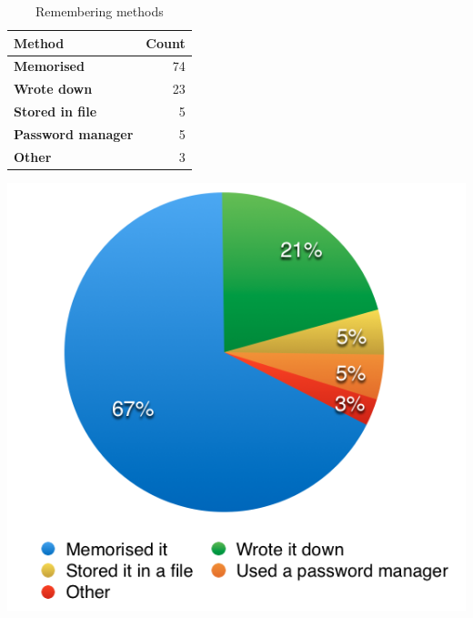     \begin{table}[htpb]
      \begin{minipage}[b]{0.42\linewidth}
        \centering
        \small
        \begin{tabular}{l r}
          \toprule
          \textbf{Method} & \textbf{Count} \\ \midrule
          \textbf{Memorised} & 74 \\
          \textbf{Wrote down} & 23 \\
          \textbf{Stored in file} & 5 \\
          \textbf{Password manager} & 5 \\
          \textbf{Other} & 3 \\ \bottomrule
        \end{tabular}
          \caption{Remembering methods}
          \label{tab:remember}
      \end{minipage}\hfill
      \begin{minipage}[b]{0.55\linewidth}
        \centering
        \includegraphics[width=\linewidth]{Images/remember-method}
        \label{fig:remember}
      \end{minipage}
    \end{table}

